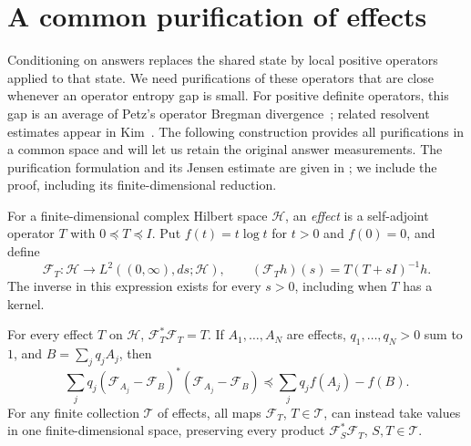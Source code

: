 \section{A common purification of effects}
\label{sec:operators}

Conditioning on answers replaces the shared state by local positive
operators applied to that state. We need purifications of these operators
that are close whenever an operator entropy gap is small. For positive
definite operators, this gap is an average of Petz's operator Bregman
divergence~\cite{petz2007}; related resolvent estimates appear in
Kim~\cite{kim2014}. The following construction provides all purifications
in a common space and will let us retain the original answer measurements.
The purification formulation and its Jensen estimate are given in
\cite[Chapter~6, Definition~4.2, Lemma~4.3, and Appendix~A.4]{tenadvances2026};
we include the proof, including its finite-dimensional reduction.

For a finite-dimensional complex Hilbert space $\mathcal H$, an
\emph{effect} is a self-adjoint operator $T$ with $0\preceq T\preceq I$.
Put $f(t)=t\log t$ for $t>0$ and $f(0)=0$, and define
\[
 \mathcal F_T:\mathcal H\longrightarrow
 L^2((0,\infty),ds;\mathcal H),\qquad
 (\mathcal F_T h)(s)=T(T+sI)^{-1}h.
\]
The inverse in this expression exists for every $s>0$, including when
$T$ has a kernel.

\begin{lemma}
\label{lem:resolvent}
For every effect $T$ on $\mathcal H$,
$\mathcal F_T^*\mathcal F_T=T$.  If $A_1,\ldots,A_N$ are effects,
$q_1,\ldots,q_N>0$ sum to $1$, and $B=\sum_jq_jA_j$, then
\begin{equation}
 \sum_j q_j(\mathcal F_{A_j}-\mathcal F_B)^*
                 (\mathcal F_{A_j}-\mathcal F_B)
 \preceq \sum_jq_j f(A_j)-f(B).
 \label{eq:resolvent-jensen}
\end{equation}
For any finite collection $\mathscr T$ of effects, all maps
$\mathcal F_T$, $T\in\mathscr T$, can instead take values in one
finite-dimensional space, preserving every product
$\mathcal F_S^*\mathcal F_T$, $S,T\in\mathscr T$.
\end{lemma}

